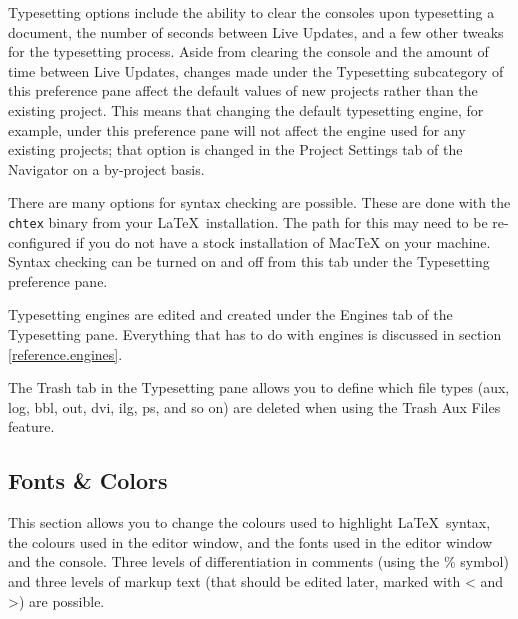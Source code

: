 Typesetting options include the ability to clear the consoles upon typesetting a document, the number of seconds between Live Updates, and a few other tweaks for the typesetting process. Aside from clearing the console and the amount of time between Live Updates, changes made under the Typesetting subcategory of this preference pane affect the default values of new projects rather than the existing project. This means that changing the default typesetting engine, for example, under this preference pane will not affect the engine used for any existing projects; that option is changed in the Project Settings tab of the Navigator on a by-project basis.

There are many options for syntax checking are possible. These are done with the \verb|chtex| binary from your \LaTeX\ installation. The path for this may need to be re-configured if you do not have a stock installation of MacTeX on your machine. Syntax checking can be turned on and off from this tab under the Typesetting preference pane.

Typesetting engines are edited and created under the Engines tab of the Typesetting pane. Everything that has to do with engines is discussed in section \ref{reference.engines}.

The Trash tab in the Typesetting pane allows you to define which file types (aux, log, bbl, out, dvi, ilg, ps, and so on) are deleted when using the Trash Aux Files feature.

\subsection{Fonts \& Colors}
\label{reference.prefs.fontcol}
This section allows you to change the colours used to highlight \LaTeX\ syntax, the colours used in the editor window, and the fonts used in the editor window and the console. Three levels of differentiation in comments (using the \% symbol) and three levels of markup text (that should be edited later, marked with {\textless} and {\textgreater}) are possible.


